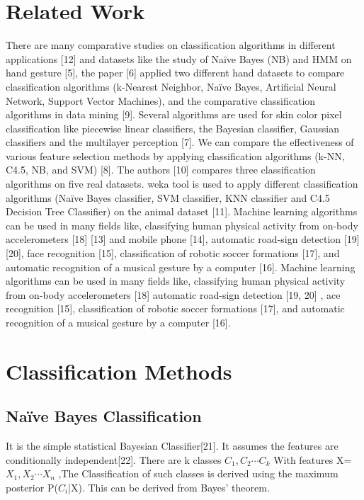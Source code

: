 \documentclass[twoside]{article}
\begin{document}
\begin{multicols}{2}
\section{Related Work}
There are many comparative studies on classification algorithms in different applications [12] and datasets like the study of  Na\"{i}ve Bayes (NB) and HMM on hand gesture [5], the paper [6] applied  two different hand datasets to compare classification algorithms (k-Nearest Neighbor,  Na\"{i}ve Bayes, Artificial Neural Network, Support Vector Machines), and the comparative classification algorithms in data mining [9]. Several algorithms are used for skin color pixel classification like piecewise linear classifiers, the Bayesian classifier, Gaussian classifiers and the multilayer perception [7]. We can compare the effectiveness of various feature selection methods by applying classification algorithms (k-NN, C4.5, NB, and SVM) [8]. The authors [10] compares three classification algorithms on five real datasets. weka tool is used to apply different classification algorithms (Na\"{i}ve Bayes classifier, SVM classifier, KNN classifier and C4.5 Decision Tree Classifier) on the animal dataset [11]. Machine learning algorithms can be used in many fields like, classifying human physical activity from on-body accelerometers [18] [13] and mobile phone [14], automatic road-sign detection [19] [20], face recognition [15],  classification of robotic soccer formations [17], and automatic recognition of a musical gesture by a computer [16].
Machine learning algorithms can be used in many fields like, classifying human physical activity from on-body accelerometers [18] automatic road-sign detection [19, 20] , ace recognition [15],  classification of robotic soccer formations [17], and automatic recognition of a musical gesture by a computer [16].

\section{Classification Methods}

\subsection*{Na\"{i}ve Bayes Classification}
It is the simple statistical Bayesian Classifier[21]. It assumes the features are conditionally independent[22]. There are k classes $C_{1}, C_{2} \cdots C_{k}$  With features X=$X_{1}, X_{2} \cdots X_{n}$ ,The Classification of such classes is derived using the maximum posterior P($C_{i}$|X). This can be derived from Bayes' theorem.


\end{multicols}
\end{document}
